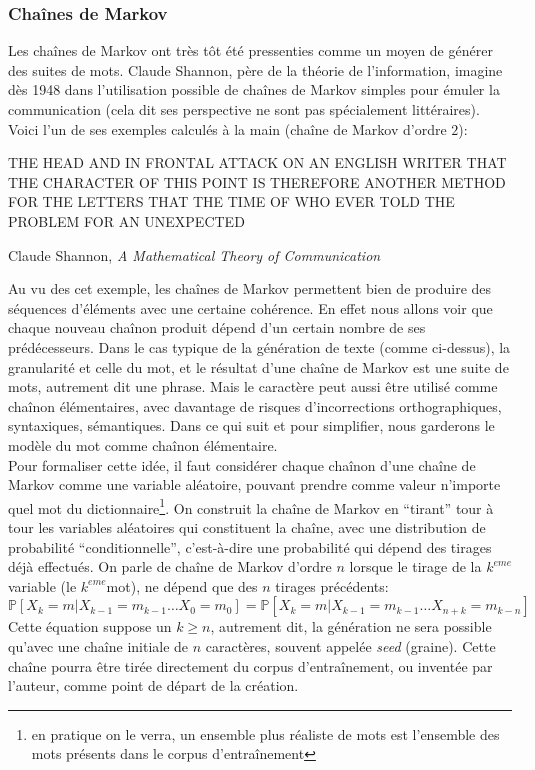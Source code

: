 \documentclass{article}
\newenvironment{citationbox}
{\begin{center}
		\begin{minipage}{.8\textwidth}
		}
		{
		\end{minipage}	
\end{center}
}
\begin{document}
			\subsubsection{Chaînes de Markov}\label{markov}
				Les chaînes de Markov ont très tôt été pressenties comme un moyen de générer des suites de mots. Claude Shannon, père de la théorie de l'information, imagine dès 1948 dans \cite{shannon1948} l'utilisation possible de chaînes de Markov simples pour émuler la communication (cela dit ses perspective ne sont pas spécialement littéraires). Voici l'un de ses exemples calculés à la main (chaîne de Markov d'ordre $2$):
				\begin{citationbox}
					THE HEAD AND IN FRONTAL ATTACK ON AN ENGLISH WRITER THAT THE CHARACTER OF THIS POINT IS THEREFORE ANOTHER METHOD FOR THE LETTERS THAT THE TIME OF WHO EVER TOLD THE PROBLEM FOR AN UNEXPECTED
					\begin{flushright}
						Claude Shannon, \textit{A Mathematical Theory of Communication} \cite{shannon1948}
					\end{flushright}
				\end{citationbox}
				Au vu des cet exemple, les chaînes de Markov permettent bien de produire des séquences d'éléments avec une certaine cohérence. En effet nous allons voir que chaque nouveau chaînon produit dépend d'un certain nombre de ses prédécesseurs. Dans le cas typique de la génération de texte (comme ci-dessus), la granularité et celle du mot, et le résultat d'une chaîne de Markov est une suite de mots, autrement dit une phrase. Mais le caractère peut aussi être utilisé comme chaînon élémentaires, avec davantage de risques d'incorrections orthographiques, syntaxiques, sémantiques. Dans ce qui suit et pour simplifier, nous garderons le modèle du mot comme chaînon élémentaire.\\
				
				Pour formaliser cette idée, il faut considérer chaque chaînon d'une chaîne de Markov comme une variable aléatoire, pouvant prendre comme valeur n'importe quel mot du dictionnaire\footnote{en pratique on le verra, un ensemble plus réaliste de mots est l'ensemble des mots présents dans le corpus d'entraînement}. On construit la chaîne de Markov en ``tirant'' tour à tour les variables aléatoires qui constituent la chaîne, avec une distribution de probabilité ``conditionnelle'', c'est-à-dire une probabilité qui dépend des tirages déjà effectués. On parle de chaîne de Markov d'ordre $n$ lorsque le tirage de la $k^{eme}$ variable (le $k^{eme}$mot), ne dépend que des $n$ tirages précédents:
				\begin{equation}
					\mathbb{P}[X_{k} = m | X_{k-1} = m_{k-1} \dots X_{0} = m_0] = \mathbb{P}[X_k = m | X_{k-1} = m_{k-1} \dots X_{n+k} = m_{k-n}]
				\end{equation}
				Cette équation suppose un $k \geq n$, autrement dit, la génération ne sera possible qu'avec une chaîne initiale de $n$ caractères, souvent appelée \textit{seed} (graine). Cette chaîne pourra être tirée directement du corpus d'entraînement, ou inventée par l'auteur, comme point de départ de la création.\\
				
\end{document}

